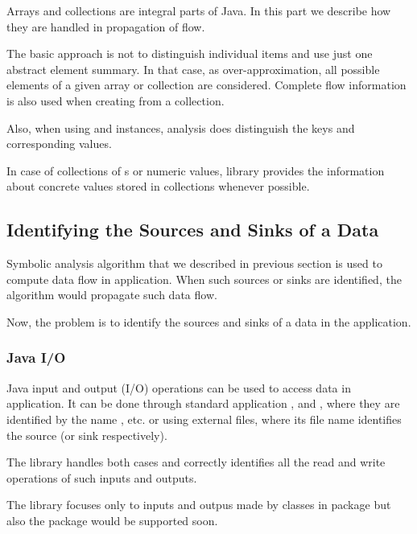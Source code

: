Arrays and collections are integral parts of Java. In this part we describe how
they are handled in propagation of flow.

The basic approach is not to distinguish individual items and use just one
abstract element summary. In that case, as over-approximation, all possible elements
of a given array or collection are considered.
Complete flow information is also used when creating 
from a collection.

Also, when using  and  instances,\break
analysis does distinguish the keys and corresponding values.

In case of collections of s or numeric values, library provides
the information about concrete values stored in collections whenever possible.





\subsection{Identifying the Sources and Sinks of a Data}

Symbolic analysis algorithm that we described in previous section is
used to compute data flow in application.
When such sources or sinks are identified, the algorithm would
propagate such data flow.

Now, the problem is to identify the sources and sinks of a data
in the application.




\subsubsection{Java I/O}

Java input and output (I/O) operations can be used to access data in application.
It can be done through standard application
,  and ,
where they are identified by the name , etc.
or using external files, where its file name identifies the source (or sink respectively).

The library handles both cases and correctly identifies
all the read and write operations of such inputs and outputs.

The library focuses only to inputs and outpus made by classes in  package
but also the  package would be supported soon.




